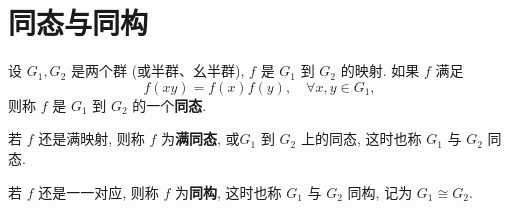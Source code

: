 \documentclass[../../main.tex]{subfiles}
\begin{document}
\section{同态与同构}

\begin{definition}
设 \( G_1,G_2 \) 是两个群 (或半群、幺半群), \( f \) 是 \( G_1 \) 到 \( G_2 \) 的映射. 如果 \( f \) 满足
\[
f(xy) = f(x)f(y), \quad \forall x,y \in G_1,
\]
则称 \( f \) 是 \( G_1 \) 到 \( G_2 \) 的一个\textbf{同态}.

若 \( f \) 还是满映射, 则称 \( f \) 为\textbf{满同态}, 或\( G_1 \) 到 \( G_2 \) 上的同态, 这时也称 \( G_1 \) 与 \( G_2 \) 同态.

若 \( f \) 还是一一对应, 则称 \( f \) 为\textbf{同构}, 这时也称 \( G_1 \) 与 \( G_2 \) 同构, 记为 \( G_1 \cong G_2 \).
\end{definition}
\end{document}
